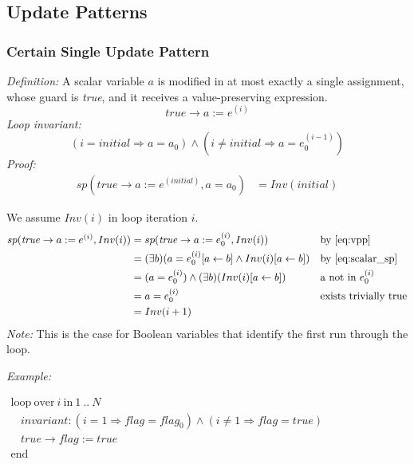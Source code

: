\documentclass[a4paper,10pt]{article}
\newcommand{\idx}{\ensuremath{i}\xspace}
\newcommand{\idxinitial}{\ensuremath{\mathit{initial}}\xspace}
\newcommand{\at}[1]{{(#1)}}
\newcommand{\KWloop}{\ensuremath{\mathrm{loop}~}}
\newcommand{\KWend}{\ensuremath{\mathrm{end}~}}
\newcommand{\KWover}{\ensuremath{\mathrm{over}~}}
\newcommand{\KWin}{\ensuremath{~\mathrm{in}~}}
\newcommand{\impl}{\ensuremath{\Longrightarrow}}
\newcommand{\loopinvariant}{\noindent\textit{Loop invariant:}\xspace}
\newcommand{\patterndef}{\noindent\textit{Definition:}\xspace}
\newcommand{\patternexample}{\noindent\textit{Example:}\xspace}
\newcommand{\patternnote}{\noindent\textit{Note:}\xspace}
\newcommand{\patternproof}{\noindent\textit{Proof:}\xspace}
\begin{document}
\subsection{Update Patterns}

\subsubsection*{Certain Single Update Pattern}

\patterndef A scalar variable $a$ is modified in at most exactly a single assignment, whose
guard is \textit{true}, and it receives a value-preserving expression.
%
$$\mathit{true} \rightarrow a := e^\at{\idx}$$
%
\loopinvariant
%
$$(\idx = \idxinitial \impl a = a_0) \land (\idx \neq \idxinitial \impl a = e_0^\at{\idx - 1})$$
%
\patternproof\\
%
\begin{align*}
sp(\mathit{true} \rightarrow a := e^\at{initial},a = a_0) &= Inv(initial)
\end{align*}


We assume $Inv(i)$ in loop iteration $i$.
\begin{align*}
sp(\mathit{true} \rightarrow a := e^\at{i},Inv(i))  &= sp(\mathit{true} \rightarrow a := e_0^\at{i},Inv(i))  && \text{by \eqref{eq:vpp}}\\
                                                    &= (\exists b) ( a = e_0^\at{i}[a \leftarrow b] \land Inv(i)[a \leftarrow b]) && \text{by \eqref{eq:scalar_sp}}\\
                                                    &= (a = e_0^\at{i}) \land (\exists b) (Inv(i)[a \leftarrow b]) && \text{a not in $e_0^\at{i}$}\\
                                                    &= a = e_0^\at{i} && \text{exists trivially true}\\
                                                    &= Inv(i+1)
\end{align*}
%
\patternnote This is the case for Boolean variables that identify the first run
through the loop.

\bigskip
\patternexample

\medskip
$\begin{array}{l}
  \KWloop \KWover i \KWin 1~..~N \\
  ~~~~ \textit{invariant}: (\idx = 1 \impl \mathit{flag} = \mathit{flag}_0) \land (\idx \neq 1 \impl flag = true)\\
  ~~~~ true \rightarrow \mathit{flag} := true\\
  \KWend
\end{array}$
\end{document}
